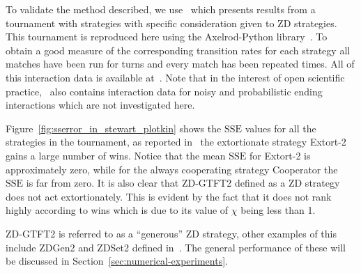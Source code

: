 \documentclass[a4paper]{article}
\newcommand{\SSe}{\text{SSE}}
\begin{document}
To validate the method described, we use~\cite{Stewart2012} which
presents results from a tournament with
strategies
with specific consideration given to ZD strategies. This
tournament is reproduced here using the Axelrod-Python
library~\cite{Knight2016}. To obtain a good measure of the corresponding
transition rates for each strategy all matches have been run for
turns and every match has been
repeated times. All of this
interaction data is available at~\cite{vincent_knight_2018_1297075}. Note that
in the interest of open scientific practice,~\cite{vincent_knight_2018_1297075}
also contains interaction data for noisy and probabilistic ending interactions
which are not investigated here.

Figure~\ref{fig:sserror_in_stewart_plotkin} shows the
\(\SSe\) values for all the strategies in the tournament, as
reported in~\cite{Stewart2012} the extortionate strategy Extort-2 gains a large number of
wins. Notice that the mean \(\SSe\) for Extort-2 is approximately zero, while for
the always cooperating strategy Cooperator the \(\SSe\) is far from zero. It is
also clear that ZD-GTFT2 defined as a ZD strategy does not act
extortionately. This is evident by the fact that it does not rank highly according
to wins which is due to its value of \(\chi\) being less than 1.

ZD-GTFT2 is referred to as a ``generous'' ZD strategy, other examples of this
include ZDGen2 and ZDSet2 defined in~\cite{sep-prisoner-dilemma}. The
general performance of these will be discussed in
Section~\ref{sec:numerical-experiments}.
\end{document}
